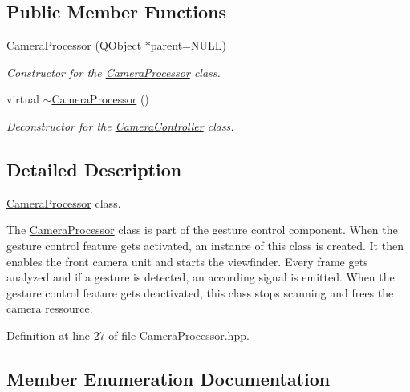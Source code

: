 \subsection*{Public Member Functions}
\begin{DoxyCompactItemize}
\item 
\hyperlink{class_camera_processor_af26223b70bc4d625f9c4d6ba274ce177}{Camera\+Processor} (Q\+Object $\ast$parent=N\+U\+L\+L)
\begin{DoxyCompactList}\small\item\em Constructor for the \hyperlink{class_camera_processor}{Camera\+Processor} class. \end{DoxyCompactList}\item 
virtual \hyperlink{class_camera_processor_a89cc3fe4d8348f1af2dbdcdf9736ae02}{$\sim$\+Camera\+Processor} ()
\begin{DoxyCompactList}\small\item\em Deconstructor for the \hyperlink{class_camera_controller}{Camera\+Controller} class. \end{DoxyCompactList}\end{DoxyCompactItemize}


\subsection{Detailed Description}
\hyperlink{class_camera_processor}{Camera\+Processor} class. 

The \hyperlink{class_camera_processor}{Camera\+Processor} class is part of the gesture control component. When the gesture control feature gets activated, an instance of this class is created. It then enables the front camera unit and starts the viewfinder. Every frame gets analyzed and if a gesture is detected, an according signal is emitted. When the gesture control feature gets deactivated, this class stops scanning and frees the camera ressource. 

Definition at line 27 of file Camera\+Processor.\+hpp.



\subsection{Member Enumeration Documentation}
\hypertarget{class_camera_processor_a302481f2bda71ed63fda97d280abe128}{}
